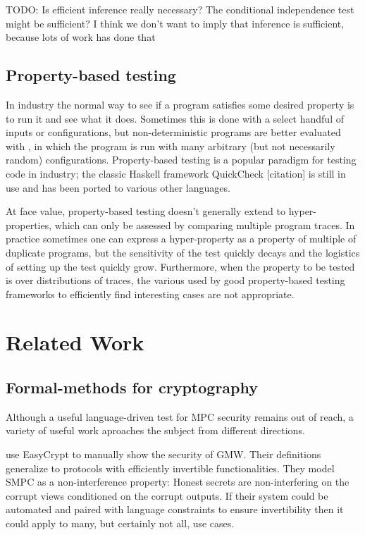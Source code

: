 \documentclass[conference]{IEEEtran}
\begin{document}
TODO: Is efficient inference really necessary? The conditional independence test might be sufficient? I think we don't want to imply that inference is sufficient, because lots of work has done that

\subsection{Property-based testing}

In industry the normal way to see if a program satisfies some desired property is to run it and see what it does.
Sometimes this is done with a select handful of inputs or configurations,
but non-deterministic programs are better evaluated with ,
in which the program is run with many arbitrary (but not necessarily random) configurations.
Property-based testing is a popular paradigm for testing code in industry;
the classic Haskell framework QuickCheck [citation] %
is still in use and has been ported to various other languages.

At face value, property-based testing doesn't generally extend to hyper-properties,
which can only be assessed by comparing multiple program traces.
In practice sometimes one can express a hyper-property as a property of multiple of duplicate programs,
but the sensitivity of the test quickly decays and the logistics of setting up the test quickly grow.
Furthermore, when the property to be tested is over distributions of traces,
the various used by good property-based testing frameworks to efficiently find interesting cases are not appropriate.


\section{Related Work}

\subsection{Formal-methods for cryptography}
Although a useful language-driven test for MPC security remains out of reach,
a variety of useful work aproaches the subject from different directions.

\cite{https://arxiv.org/pdf/1806.07197.pdf} %
use EasyCrypt to manually show the security of GMW.
Their definitions generalize to protocols with efficiently invertible functionalities.
They model SMPC as a non-interference property: Honest secrets are non-interfering on the corrupt views conditioned on the corrupt outputs.
If their system could be automated and paired with language constraints to ensure invertibility then it
could apply to many, but certainly not all, use cases.
\end{document}
